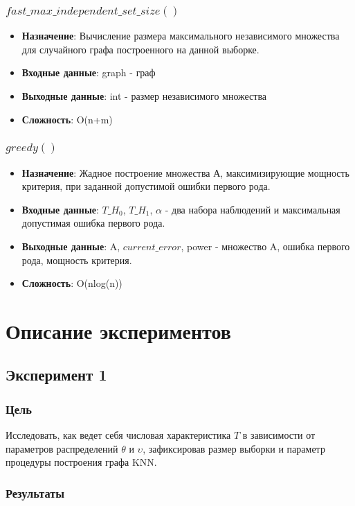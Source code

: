 \documentclass[a4paper, 12pt]{article}
\begin{document}
\subsubsection{$fast\_max\_independent\_set\_size()$}
\begin{itemize}
    \item \textbf{Назначение}: Вычисление размера максимального независимого множества для случайного графа построенного на данной выборке.
    \item \textbf{Входные данные}: graph - граф
    \item \textbf{Выходные данные}: int - размер независимого множества
    \item \textbf{Сложность}: O(n+m)
\end{itemize}

\subsubsection{$greedy()$}
\begin{itemize}
    \item \textbf{Назначение}: Жадное построение множества А, максимизирующие мощность критерия, при заданной допустимой ошибки первого рода.
    \item \textbf{Входные данные}: $T\_H_0$, $T\_H_1$, $\alpha$ - два набора наблюдений и максимальная допустимая ошибка первого рода.
    \item \textbf{Выходные данные}: A, $current\_error$, power - множество A, ошибка первого рода, мощность критерия. 
    \item \textbf{Сложность}: O(nlog(n))
\end{itemize}

\section{Описание экспериментов}
\subsection{Эксперимент 1}
\subsubsection{Цель}
Исследовать, как ведет себя числовая характеристика $T$ в зависимости
от параметров распределений $θ$ и $υ$, зафиксировав размер выборки и
параметр процедуры построения графа KNN.\\

\subsubsection{Результаты}
\end{document}
